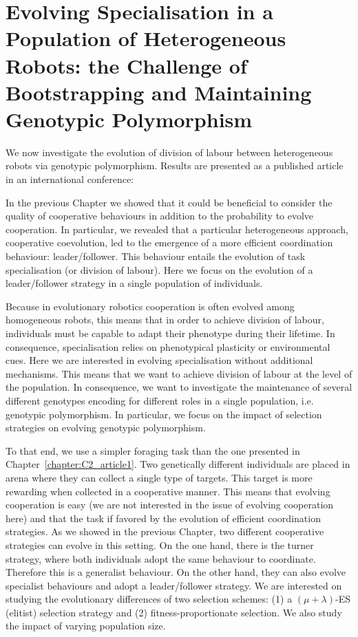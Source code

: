 \chapter{Evolving Specialisation in a Population of Heterogeneous Robots: the Challenge of Bootstrapping and Maintaining Genotypic Polymorphism}
\label{chapter:C2_article2}

\setcounter{secnumdepth}{0}
\setcounter{minitocdepth}{1}
\minitoc[n] %

We now investigate the evolution of division of labour between heterogeneous robots via genotypic polymorphism. Results are presented as a published article in an international conference:

\begin{quote}
\end{quote}


In the previous Chapter we showed that it could be beneficial to consider the quality of cooperative behaviours in addition to the probability to evolve cooperation. In particular, we revealed that a particular heterogeneous approach, cooperative coevolution, led to the emergence of a more efficient coordination behaviour: leader/follower. This behaviour entails the evolution of task specialisation (or division of labour). Here we focus on the evolution of a leader/follower strategy in a single population of individuals. 

Because in evolutionary robotics cooperation is often evolved among homogeneous robots, this means that in order to achieve division of labour, individuals must be capable to adapt their phenotype during their lifetime. In consequence, specialisation relies on phenotypical plasticity or environmental cues. Here we are interested in evolving specialisation without additional mechanisms. This means that we want to achieve division of labour at the level of the population. In consequence, we want to investigate the maintenance of several different genotypes encoding for different roles in a single population, i.e. genotypic polymorphism. In particular, we focus on the impact of selection strategies on evolving genotypic polymorphism.

To that end, we use a simpler foraging task than the one presented in Chapter~\ref{chapter:C2_article1}. Two genetically different individuals are placed in arena where they can collect a single type of targets. This target is more rewarding when collected in a cooperative manner. This means that evolving cooperation is easy (we are not interested in the issue of evolving cooperation here) and that the task if favored by the evolution of efficient coordination strategies. As we showed in the previous Chapter, two different cooperative strategies can evolve in this setting. On the one hand, there is the turner strategy, where both individuals adopt the same behaviour to coordinate. Therefore this is a generalist behaviour. On the other hand, they can also evolve specialist behaviours and adopt a leader/follower strategy. We are interested on studying the evolutionary differences of two selection schemes: (1) a \((\mu + \lambda)\)-ES (elitist) selection strategy and (2) fitness-proportionate selection. We also study the impact of varying population size.

